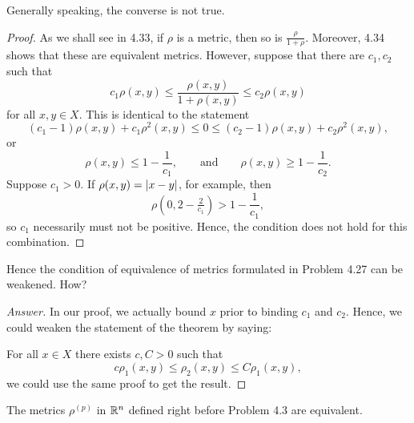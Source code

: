 \begin{minorEx}
    Generally speaking, the converse is not true.
\end{minorEx}

\begin{proof}
    As we shall see in 4.33, if $\rho$ is a metric, then so is $\frac{\rho}{1 +
    \rho}$. Moreover, 4.34 shows that these are equivalent metrics. However,
    suppose that there are $c_1, c_2$ such that 
    \[
        c_1 \rho(x, y) \leq
        \frac{\rho(x, y)}{1 + \rho(x, y)} \leq
        c_2 \rho(x, y)
    \]
    for all $x, y \in X$. This is identical to the statement
    \[
        (c_1 - 1) \rho(x, y) + c_1 \rho^2(x,y) \leq 0 \leq
        (c_2 - 1) \rho(x, y) + c_2 \rho^2(x,y),
    \]
    or
    \[
        \rho(x, y) \leq 1 - \frac{1}{c_1},
        \qquad \text{and} \qquad
        \rho(x, y) \geq 1 - \frac{1}{c_2}.
    \]
    Suppose $c_1 > 0$. If $\rho(x,y) = |x - y|$, for example, then
    \[
        \rho(0, 2 - \tfrac{2}{c_1}) > 1 - \frac{1}{c_1},
    \]
    so $c_1$ necessarily must not be positive. Hence, the condition does not
    hold for this combination.
\end{proof}

\begin{minorEx}
    [Riddle]
    Hence the condition of equivalence of metrics formulated in Problem 4.27 can
    be weakened. How?
\end{minorEx}

\begin{proof}
    [Answer]
    In our proof, we actually bound $x$ prior to binding $c_1$ and $c_2$. Hence,
    we could weaken the statement of the theorem by saying:

    For all $x \in X$ there exists $c, C > 0$ such that
    \[
        c \rho_1(x,y) \leq \rho_2(x,y) \leq C \rho_1(x,y),
    \]
    we could use the same proof to get the result.
\end{proof}

\begin{minorEx}
    The metrics $\rho^{(p)}$ in $\mathbb{R}^n$ defined right before Problem 4.3 are
    equivalent.
\end{minorEx}

